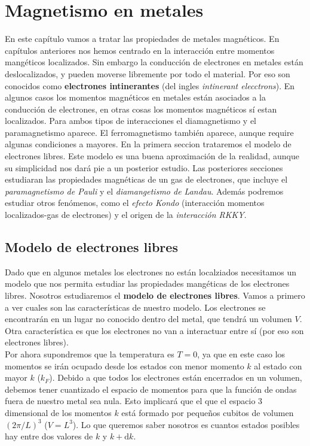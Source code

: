 \documentclass[12pt,a4paper]{book}
\numberwithin{equation}{section}
\numberwithin{figure}{section}
\newcommand{\D}{\mathrm{d}}
\begin{document}

\newpage
\chapter{Magnetismo en metales}

En este capítulo vamos a tratar las propiedades de metales magnéticos. En capítulos anteriores nos hemos centrado en la interacción entre momentos mangéticos localizados.  Sin embargo la conducción de electrones en metales están deslocalizados, y pueden moverse libremente por todo el material. Por eso son conocidos como \textbf{electrones intinerantes} (del ingles \textit{intinerant elecctrons}). En algunos casos los momentos magnéticos en metales están asociados a la conducción de electrones, en otras cosas los momentos magnéticos sí estan localizados. Para ambos tipos de interacciones el diamagnetismo y el paramagnetismo aparece. El ferromagnetismo también aparece, aunque require algunas condiciones a mayores. En la primera seccion trataremos el modelo de electrones libres. Este modelo es una buena aproximación de la realidad, aunque su simplicidad nos dará pie a un posterior estudio. Las posteriores secciones estudiaran las propiedades magnéticas de un gas de electrones, que incluye el \textit{paramagnetismo de Pauli} y el \textit{diamangetismo de Landau}. Además podremos estudiar otros fenómenos, como el \textit{efecto Kondo} (interacción momentos localizados-gas de electrones) y el origen de la \textit{interacción RKKY}. 


\section{Modelo de electrones libres}

Dado que en algunos metales los electrones no están localziados necesitamos un modelo que nos permita estudiar las propiedades mangéticas de los electrones libres. Nosotros estudiaremos el \textbf{modelo de electrones libres}. Vamos a primero a ver cuales son las características de nuestro modelo. Los electrones se encontrarán en un lugar no conocido dentro del metal, que tendrá un volumen $V$. Otra característica es que los electrones no van a interactuar entre sí (por eso son electrones libres). \\

Por ahora supondremos que la temperatura es $T=0$, ya que en este caso los momentos se irán ocupado desde los estados con menor momento $k$ al estado con mayor $k$ ($k_F$). Debido a que todos los electrones están encerrados en un volumen, debemos tener cuantizado el espacio de momentos para que la función de ondas fuera de nuestro metal sea nula. Esto implicará que el que el espacio 3 dimensional de los momentos $k$ está formado por pequeños cubitos de volumen $(2 \pi / L)^3$ ($V=L^3$). Lo que queremos saber nosotros es cuantos estados posibles hay entre dos valores de $k$ y $k+\D k$. \\
\end{document}
